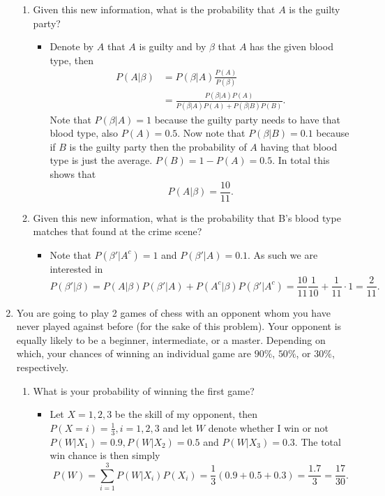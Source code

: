 \documentclass{article}
\begin{document}
\begin{enumerate}
		\begin{enumerate}
			\item Given this new information, what is the probability that $A$ is the guilty party?
				\begin{itemize}
					\item Denote by $A$ that $A$ is guilty and by $\beta$ that $A$ has the given blood type, then
					$$
					\begin{aligned}
					P(A|\beta) &= P(\beta|A) \frac{P(A)}{P(\beta)} \\
					&= \frac{P(\beta|A)P(A)}{P(\beta|A)P(A) + P(\beta|B)P(B)}.
					\end{aligned}
					$$
					Note that $P(\beta|A) = 1$ because the guilty party needs to have that blood type, also $P(A) = 0.5$. Now note that $P(\beta|B) = 0.1$ because if $B$ is the guilty party then the probability of $A$ having that blood type is just the average. $P(B) = 1 - P(A) = 0.5$. In total this shows that
					$$
					P(A|\beta) = \frac{10}{11}.
					$$
				\end{itemize}
			\item Given this new information, what is the probability that B’s blood type matches that found at the crime scene?
				\begin{itemize}
					\item Note that $P(\beta'|A^c) = 1$ and $P(\beta'|A) = 0.1$. As such we are interested in
					$$
					P(\beta'|\beta) = P(A|\beta)P(\beta'|A) + P(A^c|\beta)P(\beta'|A^c) = \frac{10}{11} \frac{1}{10} + \frac{1}{11} \cdot 1 = \frac{2}{11}.
					$$
				\end{itemize}
		\end{enumerate}
	\item You are going to play 2 games of chess with an opponent whom you have never played against before (for the sake of this problem). Your opponent is equally likely to be a beginner, intermediate, or a master. Depending on which, your chances of winning an individual game are $90\%$, $50\%$, or $30\%$, respectively.
		\begin{enumerate}
			\item What is your probability of winning the first game?
				\begin{itemize}
					\item Let $X = 1, 2, 3$ be the skill of my opponent, then $P(X = i) = \frac{1}{3}, i = 1, 2, 3$ and let $W$ denote whether I win or not $P(W|X_1) = 0.9, P(W|X_2) = 0.5$ and $P(W|X_3) = 0.3$. The total win chance is then simply
					$$
					P(W) = \sum_{i = 1}^3 P(W|X_i)P(X_i) = \frac{1}{3} \left(0.9 + 0.5 + 0.3 \right) = \frac{1.7}{3} = \frac{17}{30}.
$$
\end{itemize}
\end{enumerate}
\end{enumerate}
\end{document}
